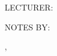 \begin{titlepage}
    \begin{addmargin}[-1cm]{0cm} %
        \begin{center}
            \vfill
            \hfill
            
            \Huge        
            \faCarrot 
            \vspace{1.5cm}
            
            \Large
            \MakeTextUppercase{\myUni}
            
            \vspace{0.2cm}
            \myDepartment
            
            \vspace{0.7cm}
            \textbf{\myDegree}
            
            \vspace{1.5cm}
            \huge
            \myCourse
            
            \large
            \vspace{2.5cm}
            \begin{flushleft}
                \MakeTextUppercase{lecturer:} \myLecturer
            \end{flushleft}
            \begin{flushright}
                \MakeTextUppercase{notes by:} \myName
            \end{flushright}
            
            \vfill
            \myLocation, \myYear
        \end{center}
    \end{addmargin}
 \end{titlepage}